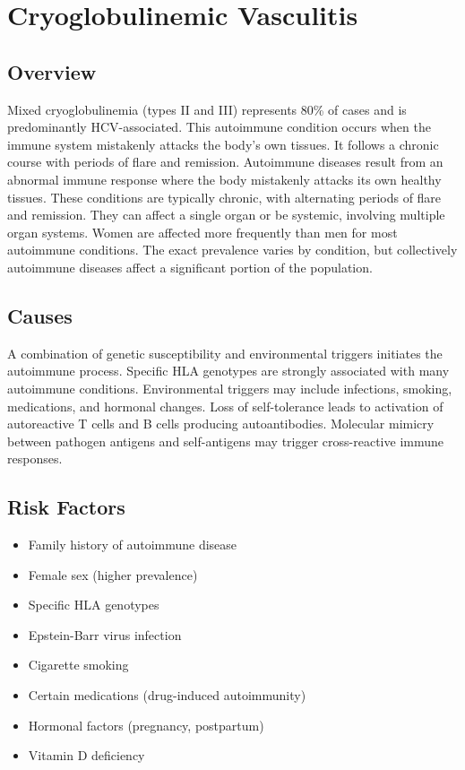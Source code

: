 \chapter{Cryoglobulinemic Vasculitis}
\label{sec:Cryoglobulinemic Vasculitis}

\section{Overview}
Mixed cryoglobulinemia (types II and III) represents 80\% of cases and is predominantly HCV-associated. This autoimmune condition occurs when the immune system mistakenly attacks the body's own tissues. It follows a chronic course with periods of flare and remission. Autoimmune diseases result from an abnormal immune response where the body mistakenly attacks its own healthy tissues. These conditions are typically chronic, with alternating periods of flare and remission. They can affect a single organ or be systemic, involving multiple organ systems. Women are affected more frequently than men for most autoimmune conditions. The exact prevalence varies by condition, but collectively autoimmune diseases affect a significant portion of the population.
\section{Causes}
A combination of genetic susceptibility and environmental triggers initiates the autoimmune process. Specific HLA genotypes are strongly associated with many autoimmune conditions. Environmental triggers may include infections, smoking, medications, and hormonal changes. Loss of self-tolerance leads to activation of autoreactive T cells and B cells producing autoantibodies. Molecular mimicry between pathogen antigens and self-antigens may trigger cross-reactive immune responses.
\section{Risk Factors}

\begin{itemize}[noitemsep]
  \item Family history of autoimmune disease
  \item Female sex (higher prevalence)
  \item Specific HLA genotypes
  \item Epstein-Barr virus infection
  \item Cigarette smoking
  \item Certain medications (drug-induced autoimmunity)
  \item Hormonal factors (pregnancy, postpartum)
  \item Vitamin D deficiency
\end{itemize}
